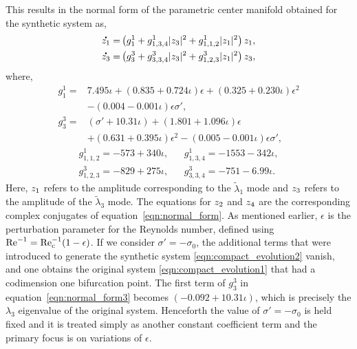 This results in the normal form of the parametric center manifold obtained for the synthetic system as,
\begin{subequations}
	\label{eqn:normal_form}
	\begin{align}
		\label{eqn:normal_form1}
			\accentset{\mbox{\large\bfseries .}}{z_{1}} =& \left(g^{1}_{1} 
			+ g^{1}_{1,3,4}|z_{3}|^{2} + 	g^{1}_{1,1,2}|z_{1}|^{2}\right)z_{1}, \\
		\label{eqn:normal_form3}
			\accentset{\mbox{\large\bfseries .}}{z_{3}} =& \left(g^{3}_{3}  
			+ g^{3}_{3,3,4}|z_{3}|^{2}
			+ g^{3}_{1,2,3}|z_{1}|^{2}\right)z_{3},
	\end{align}
\end{subequations}
where,
\begin{equation}
\begin{aligned}
	g^{1}_{1} =& 7.495\iota + (0.835 + 0.724\iota)\epsilon 
	+ (0.325 + 0.230\iota)\epsilon^{2} \nonumber \\
	& - (0.004 - 0.001\iota)\epsilon\sigma', \nonumber \\
	g^{3}_{3} =& (\sigma' + 10.31\iota) + (1.801 + 1.096\iota)\epsilon \nonumber \\
	& + (0.631 + 0.395\iota)\epsilon^{2} - (0.005 - 0.001\iota)\epsilon\sigma', \nonumber 
\end{aligned}
\end{equation}
\begin{equation}
	\begin{aligned}
		g^{1}_{1,1,2} = -573 + 340\iota, && g^{1}_{1,3,4} = -1553 - 342\iota, \nonumber \\ 
		g^{3}_{1,2,3} = - 829 + 275\iota, && g^{3}_{3,3,4} =  -751 - 6.99\iota. \nonumber
	\end{aligned}
\end{equation}
Here, $z_{1}$ refers to the amplitude corresponding to the $\widetilde{\lambda}_{1}$ mode and $z_{3}$ refers to the amplitude of the $\widetilde{\lambda}_{3}$ mode. The equations for $z_{2}$ and $z_{4}$ are the corresponding complex conjugates of equation~\ref{eqn:normal_form}. As mentioned earlier, $\epsilon$ is the perturbation parameter for the Reynolds number, defined using $\mathrm{\mathrm{Re}^{-1}} = \mathrm{\mathrm{Re}_{c}^{-1}}(1 - \epsilon)$. If we consider $\sigma' = - \sigma_{0}$, the additional terms that were introduced to generate the synthetic system \eqref{eqn:compact_evolution2} vanish, 
and one obtains the original system \eqref{eqn:compact_evolution1} that had a codimension one bifurcation point. The first term of $g^{3}_{3}$ in equation~\eqref{eqn:normal_form3} becomes $(-0.092 + 10.31\iota)$, which is precisely the $\lambda_{3}$ eigenvalue of the original system. Henceforth the value of $\sigma'=-\sigma_{0}$ is held fixed and it is treated simply as another constant coefficient term and the primary focus is on variations of $\epsilon$. 

